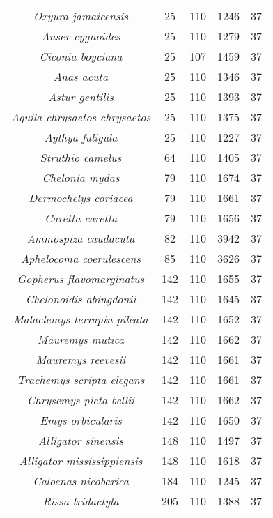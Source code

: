 \begin{longtable}[c]{|c|c|c|c|c|}
\textit{Oxyura jamaicensis}           & 25   & 110 & 1246 & 37 \\
\textit{Anser cygnoides}              & 25   & 110 & 1279 & 37 \\
\textit{Ciconia boyciana}             & 25   & 107 & 1459 & 37 \\
\textit{Anas acuta}                   & 25   & 110 & 1346 & 37 \\
\textit{Astur gentilis}               & 25   & 110 & 1393 & 37 \\
\textit{Aquila chrysaetos chrysaetos} & 25   & 110 & 1375 & 37 \\
\textit{Aythya fuligula}              & 25   & 110 & 1227 & 37 \\
\textit{Struthio camelus}             & 64   & 110 & 1405 & 37 \\
\textit{Chelonia mydas}               & 79   & 110 & 1674 & 37 \\
\textit{Dermochelys coriacea}         & 79   & 110 & 1661 & 37 \\
\textit{Caretta caretta}              & 79   & 110 & 1656 & 37 \\
\textit{Ammospiza caudacuta}          & 82   & 110 & 3942 & 37 \\
\textit{Aphelocoma coerulescens}      & 85   & 110 & 3626 & 37 \\
\textit{Gopherus flavomarginatus}     & 142  & 110 & 1655 & 37 \\
\textit{Chelonoidis abingdonii}       & 142  & 110 & 1645 & 37 \\
\textit{Malaclemys terrapin pileata}  & 142  & 110 & 1652 & 37 \\
\textit{Mauremys mutica}              & 142  & 110 & 1662 & 37 \\
\textit{Mauremys reevesii}            & 142  & 110 & 1661 & 37 \\
\textit{Trachemys scripta elegans}    & 142  & 110 & 1661 & 37 \\
\textit{Chrysemys picta bellii}       & 142  & 110 & 1662 & 37 \\
\textit{Emys orbicularis}             & 142  & 110 & 1650 & 37 \\
\textit{Alligator sinensis}           & 148  & 110 & 1497 & 37 \\
\textit{Alligator mississippiensis}   & 148  & 110 & 1618 & 37 \\
\textit{Caloenas nicobarica}          & 184  & 110 & 1245 & 37 \\
\textit{Rissa tridactyla}             & 205  & 110 & 1388 & 37 \\

\end{longtable}
